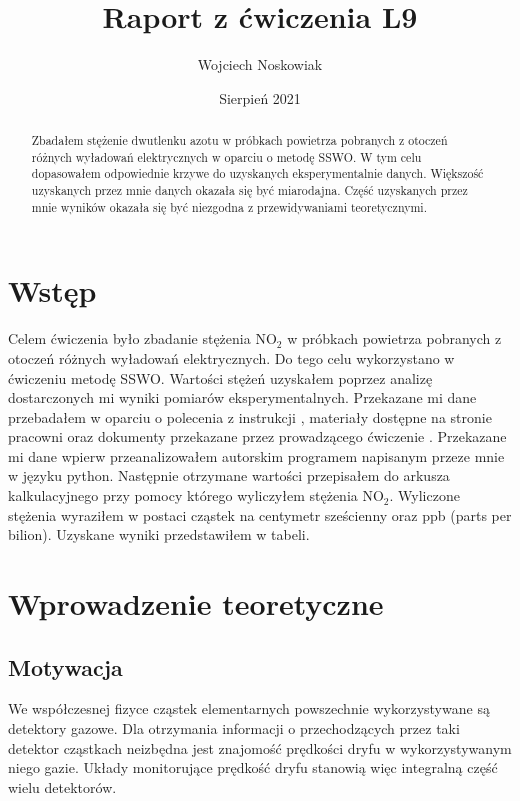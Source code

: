 \documentclass[10pt,a4paper]{article}
\author{Wojciech Noskowiak}
\title{Raport z ćwiczenia L9}
\date{Sierpień 2021}
\begin{document}
\maketitle
\tableofcontents

\begin{abstract}
    Zbadałem stężenie dwutlenku azotu w próbkach powietrza pobranych z otoczeń różnych wyładowań elektrycznych w oparciu o metodę SSWO. W tym celu dopasowałem odpowiednie krzywe do uzyskanych eksperymentalnie danych. Większość uzyskanych przez mnie danych okazała się być miarodajna. Część uzyskanych przez mnie wyników okazała się być niezgodna z przewidywaniami teoretycznymi.
\end{abstract}

\newpage

\section*{Wstęp}
Celem ćwiczenia było zbadanie stężenia $\text{NO}_{\text{2}}$ w próbkach powietrza pobranych z otoczeń różnych wyładowań elektrycznych. Do tego celu wykorzystano w ćwiczeniu metodę SSWO. Wartości stężeń uzyskałem poprzez analizę dostarczonych mi wyniki pomiarów eksperymentalnych. Przekazane mi dane przebadałem w oparciu o polecenia z instrukcji \cite{instrukcja}, materiały dostępne na stronie pracowni \cite{strona} oraz dokumenty przekazane przez prowadzącego ćwiczenie \cite{SSWO}. Przekazane mi dane wpierw przeanalizowałem autorskim programem napisanym przeze mnie w języku python. Następnie otrzymane wartości  przepisałem do arkusza kalkulacyjnego przy pomocy którego wyliczyłem stężenia $\text{NO}_{\text{2}}$. Wyliczone stężenia wyraziłem w postaci cząstek na centymetr sześcienny oraz ppb (parts per bilion). Uzyskane wyniki przedstawiłem w tabeli.

\section{Wprowadzenie teoretyczne}

\subsection{Motywacja \cite{instrukcja}}

We współczesnej fizyce cząstek elementarnych powszechnie wykorzystywane są detektory gazowe. Dla otrzymania informacji o przechodzących przez taki detektor cząstkach neizbędna jest znajomość prędkości dryfu w wykorzystywanym niego gazie. Układy monitorujące prędkość dryfu stanowią więc integralną część wielu detektorów. 
\end{document}
